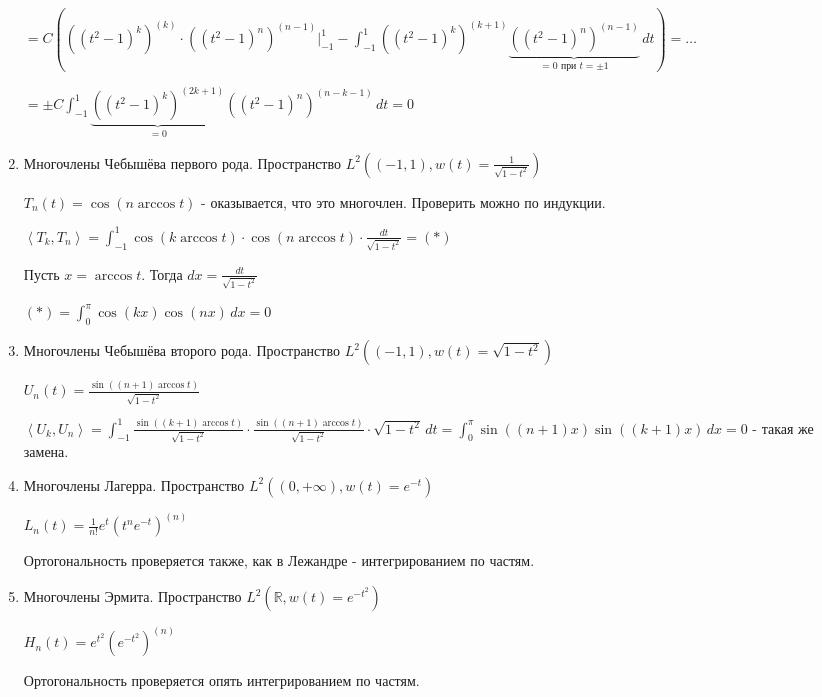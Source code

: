\begin{remark}
\begin{remark}
\begin{example}
\begin{enumerate}
{                    $= C \left( ((t^2 - 1)^k)^{(k)} \cdot ((t^2 - 1)^n)^{(n - 1)} \bigg |_{-1}^1 - \int_{-1}^1 ((t^2 - 1)^k)^{(k + 1)} \underbrace{((t^2 - 1)^n)^{(n - 1)}}_{=0 \text{ при } t = \pm 1} \, dt \right) = \ldots$

                    $= \pm C \int_{-1}^1 \underbrace{((t^2 - 1)^k)^{(2k + 1)}}_{=0} ((t^2 - 1)^n)^{(n - k - 1)} \, dt = 0$
                }
                \item {
                    Многочлены Чебышёва первого рода. Пространство $L^2 ((-1, 1), w(t) = \frac{1}{\sqrt{1 - t^2}})$

                    $T_n (t) = \cos (n \arccos t)$ - оказывается, что это многочлен. Проверить можно по индукции.

                    $\left < T_k, T_n \right > = \int_{-1}^1 \cos (k \arccos t) \cdot \cos (n \arccos t) \cdot \frac{dt}{\sqrt{1 - t^2}} = (*)$

                    Пусть $x = \arccos t$. Тогда $dx = \frac{dt}{\sqrt{1 - t^2}}$

                    $(*) = \int_0^\pi \cos (kx) \cos (nx) \, dx = 0$
                }
                \item {
                    Многочлены Чебышёва второго рода. Пространство $L^2 ((-1, 1), w(t) = \sqrt{1 - t^2})$

                    $U_n (t) = \frac{\sin ((n + 1) \arccos t)}{\sqrt{1 - t^2}}$

                    $\left < U_k, U_n \right > = \int_{-1}^1 \frac{\sin ((k + 1) \arccos t)}{\sqrt{1 - t^2}} \cdot \frac{\sin ((n + 1) \arccos t)}{\sqrt{1 - t^2}} \cdot \sqrt{1 - t^2} \, dt = \int_0^\pi \sin ((n + 1)x) \sin ((k + 1)x) \, dx = 0$ - такая же замена.
                }
                \item {
                    Многочлены Лагерра. Пространство $L^2 ((0, +\infty), w(t) = e^{-t})$

                    $L_n (t) = \frac{1}{n!} e^t (t^n e^{-t})^{(n)}$

                    Ортогональность проверяется также, как в Лежандре - интегрированием по частям.
                }
                \item {
                    Многочлены Эрмита. Пространство $L^2 (\mathbb{R}, w(t) = e^{-t^2})$

                    $H_n (t) = e^{t^2} (e^{-t^2})^{(n)}$

                    Ортогональность проверяется опять интегрированием по частям.
                }
            \end{enumerate}
        \end{example}
    \end{remark}
\end{remark}

